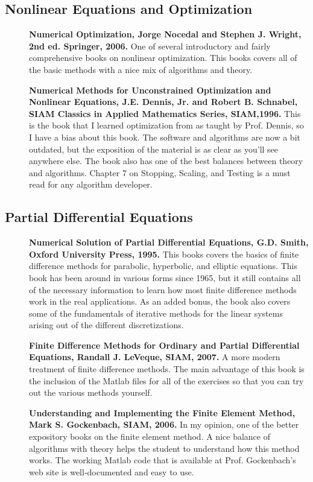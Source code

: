 \documentclass[11pt]{article}
\begin{document}
\subsection{Nonlinear Equations and Optimization}
\begin{description}

\item[] {\bf Numerical Optimization, Jorge Nocedal and Stephen J. Wright, 2nd ed. Springer, 2006.}  One of several introductory and fairly comprehensive books on nonlinear optimization. This books covers all of the basic methods with a nice mix of algorithms and theory.

\item[] {\bf Numerical Methods for Unconstrained Optimization and Nonlinear Equations, J.E. Dennis, Jr. and Robert B. Schnabel, SIAM Classics in Applied Mathematics Series, SIAM,1996.}  This is the book that I learned optimization from as taught by Prof. Dennis, so I have a bias about this book.  The software and algorithms are now a bit outdated, but the exposition of the material is as clear as you'll see anywhere else.  The book also has one of the best balances between theory and algorithms.   Chapter 7 on Stopping, Scaling, and Testing is a must read for any algorithm developer.

\end{description}

\subsection{Partial Differential Equations}
\begin{description}

\item[] {\bf Numerical Solution of Partial Differential Equations, G.D. Smith,  Oxford University Press, 1995.}  This books covers the basics of finite difference methods for parabolic, hyperbolic, and elliptic equations.  This book has been around in various forms since 1965, but it still contains all of the necessary information to learn how most finite difference methods work in the real applications.  As an added bonus, the book also covers some of the fundamentals of iterative methods for the linear systems arising out of the different discretizations.

\item[] {\bf Finite Difference Methods for Ordinary and Partial Differential Equations, Randall J. LeVeque, SIAM, 2007.}   A more modern treatment of finite difference methods.  The main advantage of this book is the inclusion of the Matlab files for all of the exercises so that you can try out the various methods yourself.

\item[] {\bf Understanding and Implementing the Finite Element Method, Mark S. Gockenbach, SIAM, 2006.}  In my opinion, one of the better expository books on the finite element method.  A nice balance of algorithms with theory helps the student to understand how this method works.  The working Matlab code that is available at Prof. Gockenbach's web site is well-documented and easy to use.
\end{description}
\end{document}
